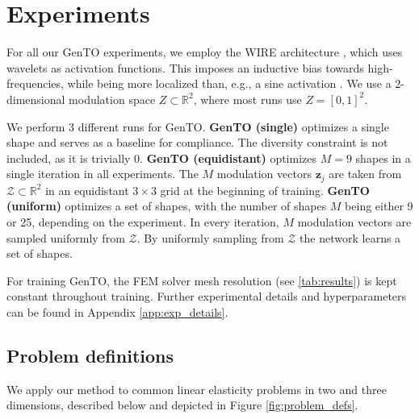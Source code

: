 \section{Experiments}


For all our GenTO experiments, we employ the WIRE architecture \citep{saragadam2023wire}, which uses wavelets as activation functions.
This imposes an inductive bias towards high-frequencies, while being more localized than, e.g., a sine activation \citep{sitzmann2019siren}.
We use a 2-dimensional modulation space $Z \subset \mathbb{R}^2$, where most runs use $Z = [0,1]^2$.

We perform 3 different runs for GenTO. 
\textbf{GenTO (single)} optimizes a single shape and serves as a baseline for compliance. The diversity constraint is not included, as it is trivially 0.
\textbf{GenTO (equidistant)} optimizes $M=9$ shapes in a single iteration in all experiments. 
The $M$ modulation vectors $\mathbf{z}_j$ are taken from $\mathcal{Z} \subset \mathbb{R}^2$ in an equidistant $3 \times 3$ grid at the beginning of training. 
\textbf{GenTO (uniform)} optimizes a set of shapes, with the number of shapes 
$M$ being either 9 or 25, depending on the experiment. In every iteration, $M$ modulation vectors are sampled uniformly from $\mathcal{Z}$.
By uniformly sampling from $\mathcal{Z}$ the network learns a set of shapes.

For training GenTO, the FEM solver mesh resolution (see \ref{tab:results}) is kept constant throughout training.
Further experimental details and hyperparameters can be found in Appendix \ref{app:exp_details}.




\subsection{Problem definitions}

We apply our method to common linear elasticity problems in two and three dimensions, described below and depicted in Figure \ref{fig:problem_defs}.


